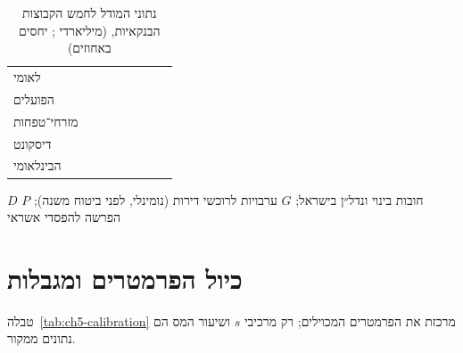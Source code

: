 \begin{table}[!htb]
\centering
\caption[נתוני חמש הקבוצות הבנקאיות]{נתוני המודל לחמש הקבוצות הבנקאיות,  (מיליארדי ; יחסים באחוזים)}
\label{tab:ch5-banks}
\footnotesize
\begin{tabularx}{\tabmaxwidth}{>{\raggedleft\arraybackslash}p{3.1cm} C C C C C C C}
\toprule
{} &  &  &  &  &  &  &  \\
\midrule
לאומי \cite{leumi_q3_2026} &  &  &  &  &  &  &  \\
הפועלים \cite{hapoalim_q3_2026} &  &  &  &  &  &  &  \\
מזרחי־טפחות \cite{mizrahi_q3_2026} &  &  &  &  &  &  &  \\
דיסקונט \cite{discount_q3_2026} &  &  &  &  &  &  &  \\
הבינלאומי \cite{fibi_q3_2026} &  &  &  &  &  &  &  \\
\bottomrule
\end{tabularx}

\smallskip
$D$ חובות בינוי ונדל״ן בישראל; $G$ ערבויות לרוכשי דירות (נומינלי, לפני ביטוח משנה); $P$ הפרשה להפסדי אשראי
\end{table}

\section{כיול הפרמטרים ומגבלות}
\label{sec:ch5-calibration}

טבלה~\ref{tab:ch5-calibration} מרכזת את הפרמטרים המכוילים; רק מרכיבי $s$ ושיעור המס הם נתונים ממקור.

